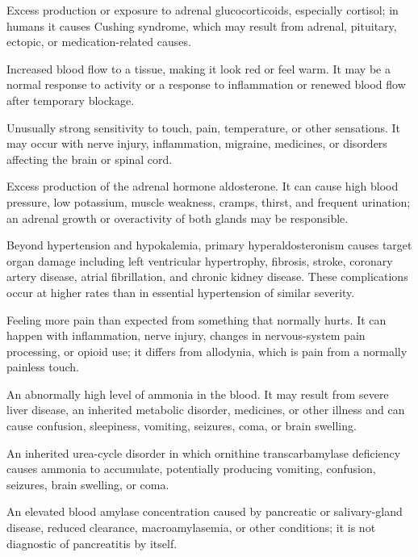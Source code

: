  Excess production or exposure to adrenal glucocorticoids, especially cortisol; in humans it causes Cushing syndrome, which may result from adrenal, pituitary, ectopic, or medication-related causes.

 Increased blood flow to a tissue, making it look red or feel warm. It may be a normal response to activity or a response to inflammation or renewed blood flow after temporary blockage.

 Unusually strong sensitivity to touch, pain, temperature, or other sensations. It may occur with nerve injury, inflammation, migraine, medicines, or disorders affecting the brain or spinal cord.

 Excess production of the adrenal hormone aldosterone. It can cause high blood pressure, low potassium, muscle weakness, cramps, thirst, and frequent urination; an adrenal growth or overactivity of both glands may be responsible.

 Beyond hypertension and hypokalemia, primary hyperaldosteronism causes target organ
damage including left ventricular hypertrophy, fibrosis, stroke, coronary artery
disease, atrial fibrillation, and chronic kidney disease. These complications occur at
higher rates than in essential hypertension of similar severity.

 Feeling more pain than expected from something that normally hurts. It can happen with inflammation, nerve injury, changes in nervous-system pain processing, or opioid use; it differs from allodynia, which is pain from a normally painless touch.

 An abnormally high level of ammonia in the blood. It may result from severe liver disease, an inherited metabolic disorder, medicines, or other illness and can cause confusion, sleepiness, vomiting, seizures, coma, or brain swelling.

 An inherited urea-cycle disorder in which ornithine transcarbamylase deficiency causes ammonia to accumulate, potentially producing vomiting, confusion, seizures, brain swelling, or coma.

 An elevated blood amylase concentration caused by pancreatic or salivary-gland disease, reduced clearance, macroamylasemia, or other conditions; it is not diagnostic of pancreatitis by itself.

